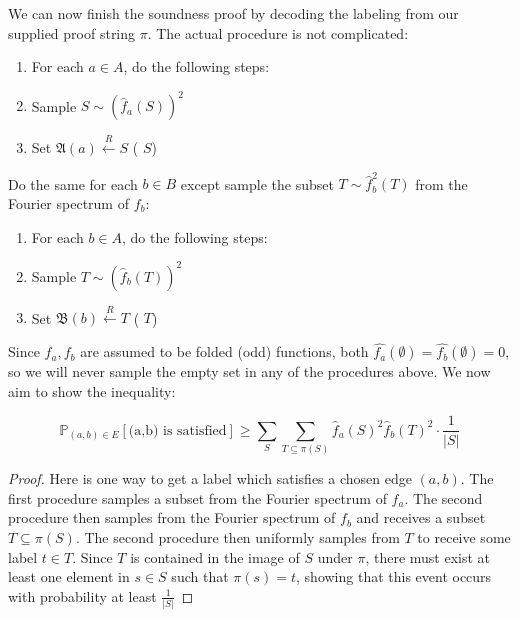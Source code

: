 We can now finish the soundness proof by decoding the labeling from our supplied proof string $\pi$. The actual procedure is not complicated:

\begin{enumerate}
    \item For each $a \in A$, do the following steps:
    \item Sample $S \sim (\widehat{f}_a(S))^2$
    \item Set $\mathfrak{A}(a) \xleftarrow{R} S$ \quad ( $S$)
\end{enumerate}

Do the same for each $b \in B$ except sample the subset $T \sim \widehat{f}_b^2(T)$ from the Fourier spectrum of $f_b$:

\begin{enumerate}
    \item For each $b \in A$, do the following steps:
    \item Sample $T \sim (\widehat{f}_b(T))^2$
    \item Set $\mathfrak{B}(b) \xleftarrow{R} T$ \quad ( $T$)
\end{enumerate}


 Since $f_a,f_b$ are assumed to be folded (odd) functions, both $\widehat{f_a}(\emptyset) = \widehat{f_b}(\emptyset) = 0$, so we will never sample the empty set in any of the procedures above. We now aim to show the inequality:

\begin{lemma} \label{firststepsoundness}
  \begin{equation}
      \mathbb{P}_{(a,b) \in E}[ \text{(a,b) is satisfied}] \geq \sum_{S} \sum_{T \subseteq \pi(S)} \widehat{f}_a(S)^2\widehat{f}_b(T)^2 \cdot \frac{1}{|S|}
  \end{equation}
\end{lemma}
\begin{proof}
  Here is one way to get a label which satisfies a chosen edge $(a,b)$. The first procedure samples a subset from the Fourier spectrum of $f_a$. The second procedure then samples from the Fourier spectrum of $f_b$ and receives a subset $T \subseteq \pi(S)$. The second procedure then uniformly samples from $T$ to receive some label $t \in T$. Since $T$ is contained in the image of $S$ under $\pi$, there must exist at least one element in $s \in S$ such that $\pi(s) = t$, showing that this event occurs with probability at least $\frac{1}{|S|}$
\end{proof}

